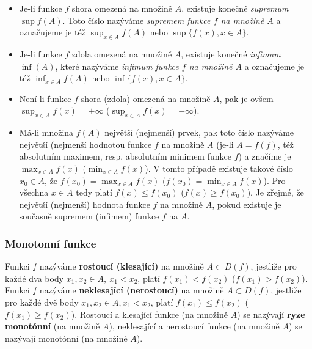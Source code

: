           

        \begin{itemize}[noitemsep]
          \item Je-li funkce $f$ shora omezená na množině $A$, existuje konečné \emph{supremum}     
                $\sup f(A)$. Toto číslo nazýváme \emph{supremem funkce $f$ na množině $A$} a 
                označujeme je též $\sup_{x\in A}f(A)$ nebo $\sup\{f(x), x\in A\}$.
          \item Je-li funkce $f$ zdola omezená na množině $A$, existuje konečné \emph{infimum} 
                $\inf(A)$, které nazýváme \emph{infimum funkce $f$ na množině $A$} a označujeme je 
                též $\inf_{x\in A}f(A)$ nebo $\inf\{f(x), x\in A\}$. 
          \item Není-li funkce $f$ shora (zdola) omezená na množině $A$, pak je ovšem $\sup_{x\in A}
                f(x)=+\infty$ ($\sup_{x\in A} f(x)=-\infty$).
          \item Má-li množina $f(A)$ největší (nejmenší) prvek, pak toto číslo nazýváme největší 
                (nejmenší hodnotou funkce $f$  na množině $A$ (je-li $A = f(f)$, též absolutním 
                maximem, resp. absolutním minimem funkce $f$) a značíme je $\max_{x\in A} f(x)$ 
                ($\min_{x\in A} f(x)$). V tomto případě existuje takové číslo $x_0\in A$, že 
                $f(x_0)=\max_{x\in A}f(x)$ ($f(x_0)=\min_{x\in A}f(x)$). Pro všechna $x\in A$ tedy 
                platí $f(x)\leq f(x_0)$ ($f(x)\geq f(x_0)$). Je zřejmé, že největší (nejmenší) 
                hodnota funkce $f$ na množině $A$, pokud existuje je současně supremem (infimem) 
                funkce $f$ na $A$.
        \end{itemize}

        
       
      \subsubsection{Monotonní funkce}
        \begin{definition}\label{MA1:def_lim02}
          Funkci $f$ nazýváme \textbf{rostoucí (klesající)} na množině $A\subset D(f)$, jestliže 
          pro každé dva body $x_1, x_2\in A,\ x_1<x_2$, platí $f(x_1)<f(x_2)$ ($f(x_1)>f(x_2)$). 
          Funkci $f$ nazýváme \textbf{neklesající (nerostoucí)} na množině $A\subset D(f)$, 
          jestliže pro každé dvě body $x_1, x_2\in A,x_1<x_2$, platí $f(x_1)\leq f(x_2)$ 
          ($f(x_1)\geq f(x_2)$). Rostoucí a klesající funkce (na množině $A$) se nazývají 
          \textbf{ryze monotónní} (na množině $A$), neklesající a nerostoucí funkce (na množině 
          $A$) se nazývají monotónní (na množině $A$).    
        \end{definition}
            
